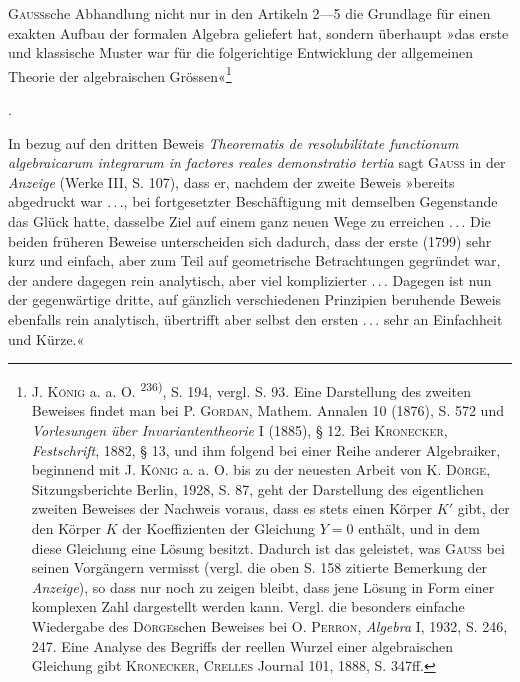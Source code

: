 \textsc{Gauss}sche Abhandlung nicht nur in den Artikeln 2—5 die Grundlage für
einen exakten Aufbau der formalen Algebra geliefert hat, sondern überhaupt
»das erste und klassische Muster war für die folgerichtige Entwicklung der
allgemeinen Theorie der algebraischen Grössen«\begingroup\renewcommand{\thefootnote}{236a)}\footnote{J. \textsc{König} a. a. O. \textsuperscript{236)}, S. 194, vergl. S. 93. Eine Darstellung des zweiten Beweises findet man bei P. \textsc{Gordan}, Mathem. Annalen 10 (1876), S. 572 und \textit{Vorlesungen über Invariantentheorie} I (1885), § 12. Bei \textsc{Kronecker}, \textit{Festschrift}, 1882, § 13, und ihm folgend bei einer Reihe anderer Algebraiker, beginnend mit J. \textsc{König} a. a. O. bis zu der neuesten Arbeit von K. \textsc{Dörge}, Sitzungsberichte Berlin, 1928, S. 87, geht der Darstellung des eigentlichen zweiten Beweises der Nachweis voraus, dass es stets einen Körper \(K'\) gibt, der den Körper \(K\) der Koeffizienten der Gleichung \(Y=0\) enthält, und in dem diese Gleichung eine Lösung besitzt. Dadurch ist das geleistet, was \textsc{Gauss} bei seinen Vorgängern vermisst (vergl. die oben S. 158 zitierte Bemerkung der \textit{Anzeige}), so dass nur noch zu zeigen bleibt, dass jene Lösung in Form einer komplexen Zahl dargestellt werden kann. Vergl. die besonders einfache Wiedergabe des \textsc{Dörge}schen Beweises bei O. \textsc{Perron}, \textit{Algebra} I, 1932, S. 246, 247. Eine Analyse des Begriffs der reellen Wurzel einer algebraischen Gleichung gibt \textsc{Kronecker}, \textsc{Crelles} Journal 101, 1888, S. 347ff.}\addtocounter{footnote}{-1}\endgroup.
\par
In bezug auf den dritten Beweis \textit{Theorematis de resolubilitate functionum
algebraicarum integrarum in factores reales demonstratio tertia} sagt \textsc{Gauss} in der
\textit{Anzeige} (Werke III, S. 107), dass er, nachdem der zweite Beweis »bereits abgedruckt
war \mbox{.\,.\,.}, bei fortgesetzter Beschäftigung mit demselben Gegenstande
das Glück hatte, dasselbe Ziel auf einem ganz neuen Wege zu erreichen \mbox{.\,.\,.}
Die beiden früheren Beweise unterscheiden sich dadurch, dass der erste (1799)
sehr kurz und einfach, aber zum Teil auf geometrische Betrachtungen gegründet
war, der andere dagegen rein analytisch, aber viel komplizierter \mbox{.\,.\,.}
Dagegen ist nun der gegenwärtige dritte, auf gänzlich verschiedenen Prinzipien
beruhende Beweis ebenfalls rein analytisch, übertrifft aber selbst den ersten
\mbox{.\,.\,.} sehr an Einfachheit und Kürze.«\par
{}

